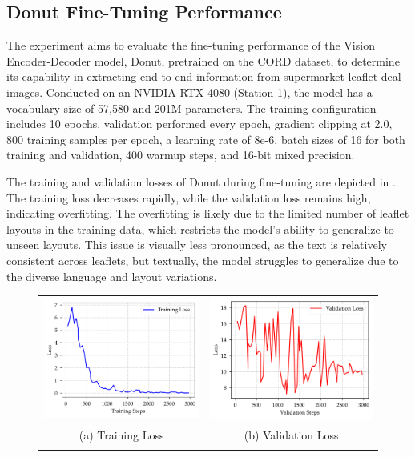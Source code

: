 \documentclass[11pt]{article}
\begin{document}
\subsection{Donut Fine-Tuning Performance}
The experiment aims to evaluate the fine-tuning performance of the Vision Encoder-Decoder model, Donut, pretrained on the CORD dataset, to determine its capability in extracting end-to-end information from supermarket leaflet deal images. Conducted on an NVIDIA RTX 4080 (Station 1), the model has a vocabulary size of 57,580 and 201M parameters. The training configuration includes 10 epochs, validation performed every epoch, gradient clipping at 2.0, 800 training samples per epoch, a learning rate of 8e-6, batch sizes of 16 for both training and validation, 400 warmup steps, and 16-bit mixed precision.

 The training and validation losses of Donut during fine-tuning are depicted in . The training loss decreases rapidly, while the validation loss remains high, indicating overfitting. The overfitting is likely due to the limited number of leaflet layouts in the training data, which restricts the model's ability to generalize to unseen layouts. This issue is visually less pronounced, as the text is relatively consistent across leaflets, but textually, the model struggles to generalize due to the diverse language and layout variations.

\begin{figure}
    \begin{tabular}{cc}
    \includegraphics[width=0.5\linewidth]{figures/donut_train_loss.png} &   \includegraphics[width=0.5\linewidth]{figures/donut_val_loss.png} \\
    (a) Training Loss & (b) Validation Loss \\[6pt]
    \label{fig:donut_loss}
    \end{tabular}
\end{figure}
\end{document}
